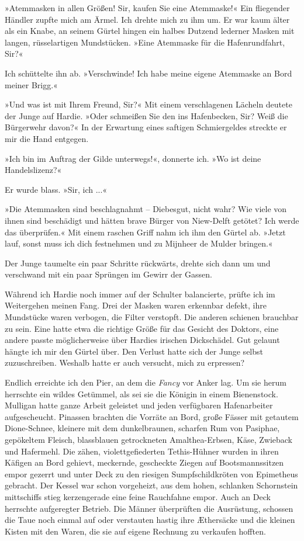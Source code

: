»Atemmasken in allen Größen! Sir, kaufen Sie eine Atemmaske!« Ein
fliegender Händler zupfte mich am Ärmel. Ich drehte mich zu ihm um.
Er war kaum älter als ein Knabe, an seinem Gürtel hingen ein halbes
Dutzend lederner Masken mit langen, rüsselartigen Mundstücken.
»Eine Atemmaske für die Hafenrundfahrt, Sir?«

Ich schüttelte ihn ab. »Verschwinde! Ich habe meine eigene
Atemmaske an Bord meiner Brigg.«

»Und was ist mit Ihrem Freund, Sir?« Mit einem verschlagenen
Lächeln deutete der Junge auf Hardie. »Oder schmeißen Sie den ins
Hafenbecken, Sir? Weiß die Bürgerwehr davon?« In der Erwartung
eines saftigen Schmiergeldes streckte er mir die Hand entgegen.

»Ich bin im Auftrag der Gilde unterwegs!«, donnerte ich. »Wo ist
deine Handelslizenz?«

Er wurde blass. »Sir, ich ...«

»Die Atemmasken sind beschlagnahmt – Diebesgut, nicht wahr? Wie
viele von ihnen sind beschädigt und hätten brave Bürger von
Niew-Delft getötet? Ich werde das überprüfen.« Mit einem raschen
Griff nahm ich ihm den Gürtel ab. »Jetzt lauf, sonst muss ich dich
festnehmen und zu Mijnheer de Mulder bringen.«

Der Junge taumelte ein paar Schritte rückwärts, drehte sich dann um
und verschwand mit ein paar Sprüngen im Gewirr der Gassen.

Während ich Hardie noch immer auf der Schulter balancierte, prüfte
ich im Weitergehen meinen Fang. Drei der Masken waren erkennbar
defekt, ihre Mundstücke waren verbogen, die Filter verstopft. Die
anderen schienen brauchbar zu sein. Eine hatte etwa die richtige
Größe für das Gesicht des Doktors, eine andere passte
möglicherweise über Hardies irischen Dickschädel. Gut gelaunt
hängte ich mir den Gürtel über. Den Verlust hatte sich der Junge
selbst zuzuschreiben. Weshalb hatte er auch versucht, mich zu
erpressen?

\bigpar

Endlich erreichte ich den Pier, an dem die \emph{Fancy} vor Anker
lag. Um sie herum herrschte ein wildes Getümmel, als sei sie die
Königin in einem Bienenstock. Mulligan hatte ganze Arbeit geleistet
und jeden verfügbaren Hafenarbeiter aufgescheucht. Pinassen
brachten die Vorräte an Bord, große Fässer mit getautem
Dione-Schnee, kleinere mit dem dunkelbraunen, scharfen Rum von
Pasiphae, gepökeltem Fleisch, blassblauen getrockneten
Amalthea-Erbsen, Käse, Zwieback und Hafermehl. Die zähen,
violettgefiederten Tethis-Hühner wurden in ihren Käfigen an Bord
gehievt, meckernde, gescheckte Ziegen auf Bootsmannssitzen empor
gezerrt und unter Deck zu den riesigen Sumpfschildkröten von
Epimetheus gebracht. Der Kessel war schon vorgeheizt, aus dem
hohen, schlanken Schornstein mittschiffs stieg kerzengerade eine
feine Rauchfahne empor. Auch an Deck herrschte aufgeregter Betrieb.
Die Männer überprüften die Ausrüstung, schossen die Taue noch
einmal auf oder verstauten hastig ihre Æthersäcke und die kleinen
Kisten mit den Waren, die sie auf eigene Rechnung zu verkaufen
hofften.


